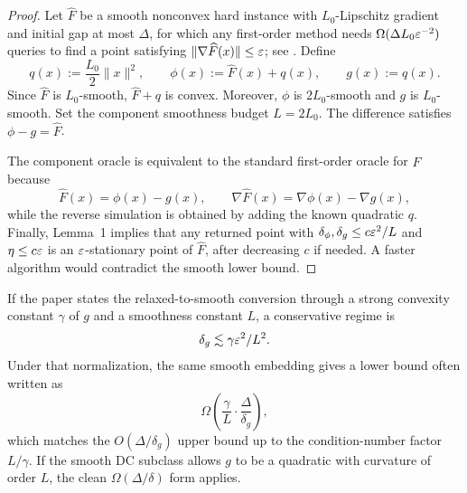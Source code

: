 \begin{proof}
Let $\widehat F$ be a smooth nonconvex hard instance with $L_0$-Lipschitz gradient and initial gap at most $\Delta$, for which any first-order method needs $\Omega(\Delta L_0\varepsilon^{-2})$ queries to find a point satisfying $\|\nabla\widehat F(x)\|\le\varepsilon$; see \citet{carmon2020lower1,carmon2020lower2}. Define
\begin{equation}
    q(x):=\frac{L_0}{2}\|x\|^2,
    \qquad
    \phi(x):=\widehat F(x)+q(x),
    \qquad
    g(x):=q(x).
\end{equation}
Since $\widehat F$ is $L_0$-smooth, $\widehat F+q$ is convex. Moreover, $\phi$ is $2L_0$-smooth and $g$ is $L_0$-smooth. Set the component smoothness budget $L=2L_0$. The difference satisfies $\phi-g=\widehat F$.

The component oracle is equivalent to the standard first-order oracle for $\widehat F$ because
\begin{equation}
    \widehat F(x)=\phi(x)-g(x),
    \qquad
    \nabla\widehat F(x)=\nabla\phi(x)-\nabla g(x),
\end{equation}
while the reverse simulation is obtained by adding the known quadratic $q$. Finally, Lemma~1 implies that any returned point with $\delta_\phi,\delta_g\le c\varepsilon^2/L$ and $\eta\le c\varepsilon$ is an $\varepsilon$-stationary point of $\widehat F$, after decreasing $c$ if needed. A faster algorithm would contradict the smooth lower bound.
\end{proof}

\begin{remark}
If the paper states the relaxed-to-smooth conversion through a strong convexity constant $\gamma$ of $g$ and a smoothness constant $L$, a conservative regime is
\begin{equation}
    \delta_g\lesssim \gamma\varepsilon^2/L^2.
\end{equation}
Under that normalization, the same smooth embedding gives a lower bound often written as
\begin{equation}
    \Omega\left(\frac{\gamma}{L}\cdot\frac{\Delta}{\delta_g}\right),
\end{equation}
which matches the $O(\Delta/\delta_g)$ upper bound up to the condition-number factor $L/\gamma$. If the smooth DC subclass allows $g$ to be a quadratic with curvature of order $L$, the clean $\Omega(\Delta/\delta)$ form applies.
\end{remark}